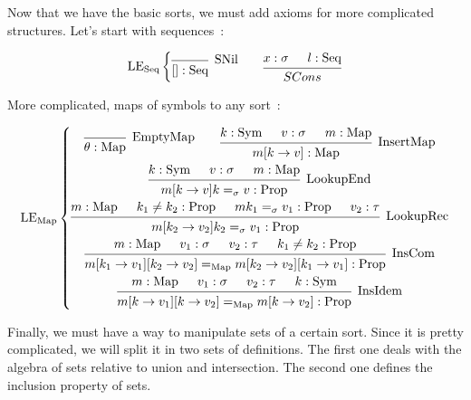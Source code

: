 \documentclass[]{article}
\newcommand{\1}{\mathbbm{1}}
\newcommand{\0}{\mathbbm{0}}
\newcommand{\Prop}{\text{Prop}}
\newcommand{\Sym}{\text{Sym}}
\newcommand{\Seq}{\text{Seq}}
\newcommand{\Map}{\text{Map}}
\newcommand{\proof}[1]{{\scantokens{\begin{prooftree}#1\end{prooftree}}}}
\begin{document}
Now that we have the basic sorts, we must add axioms for more complicated
structures. Let's start with sequences~:

\[\text{LE}_\text{Seq}\left\{
    \begin{gathered}
        \proof{
            \infer0[SNil]{[]:\Seq}
        }
        \qquad\proof{
            \hypo{x:\sigma}
            \hypo{l:\Seq}
            \infer2{SCons}{x::l : \Seq}
        }
    \end{gathered}
\right.\]

More complicated, maps of symbols to any sort~:

\[\text{LE}_\text{Map}\left\{
    \begin{gathered}
        \proof{
            \infer0[EmptyMap]{\theta:\Map}
        }
        \qquad\proof{
            \hypo{k : \Sym}
            \hypo{v : \sigma}
            \hypo{m : \Map}
            \infer3[InsertMap]{m[k\rightarrow v] : \Map}
        }\\
        \proof{
            \hypo{k : \Sym}
            \hypo{v : \sigma}
            \hypo{m : \Map}
            \infer3[LookupEnd]{m[k\rightarrow v]k =_\sigma v:\Prop}
        }\\
        \proof{
            \hypo{m : \Map}
            \hypo{k_1\neq k_2 : \Prop}
            \hypo{m k_1 =_\sigma v_1 : \Prop}
            \hypo{v_2 : \tau}
            \infer4[LookupRec]{m[k_2\rightarrow v_2]k_2 =_\sigma v_1 : \Prop}
        }\\
        \proof{
            \hypo{m : \Map}
            \hypo{v_1 : \sigma}
            \hypo{v_2 : \tau}
            \hypo{k_1\neq k_2 : \Prop}
            \infer4[InsCom]{m[k_1\rightarrow v_1][k_2\rightarrow v_2] =_\Map
                    m[k_2\rightarrow v_2][k_1\rightarrow v_1] : \Prop}
        }\\
        \proof{
            \hypo{m : \Map}
            \hypo{v_1 : \sigma}
            \hypo{v_2 : \tau}
            \hypo{k : \Sym}
            \infer4[InsIdem]{m[k\rightarrow v_1][k\rightarrow v_2] =_\Map
                    m[k\rightarrow v_2] : \Prop}
        }
    \end{gathered}
\right.\]

Finally, we must have a way to manipulate sets of a certain sort. Since it is pretty
complicated, we will split it in two sets of definitions. The first one deals with
the algebra of sets relative to union and intersection. The second one defines the
inclusion property of sets.
\end{document}
